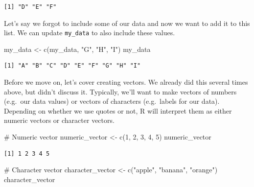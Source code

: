 \documentclass[
  letterpaper,
  DIV=11,
  numbers=noendperiod]{scrreprt}
\newenvironment{Shaded}{\begin{snugshade}}{\end{snugshade}}
\newcommand{\CommentTok}[1]{\textcolor[rgb]{0.37,0.37,0.37}{#1}}
\newcommand{\DecValTok}[1]{\textcolor[rgb]{0.68,0.00,0.00}{#1}}
\newcommand{\FunctionTok}[1]{\textcolor[rgb]{0.28,0.35,0.67}{#1}}
\newcommand{\NormalTok}[1]{\textcolor[rgb]{0.00,0.23,0.31}{#1}}
\newcommand{\OtherTok}[1]{\textcolor[rgb]{0.00,0.23,0.31}{#1}}
\newcommand{\StringTok}[1]{\textcolor[rgb]{0.13,0.47,0.30}{#1}}
\begin{document}
\begin{verbatim}
[1] "D" "E" "F"
\end{verbatim}

Let's say we forgot to include some of our data and now we want to add
it to this list. We can update \texttt{my\_data} to also include these
values.

\begin{Shaded}
\begin{Highlighting}[]
\NormalTok{my\_data }\OtherTok{\textless{}{-}} \FunctionTok{c}\NormalTok{(my\_data, }\StringTok{"G"}\NormalTok{, }\StringTok{"H"}\NormalTok{, }\StringTok{"I"}\NormalTok{)}
\NormalTok{my\_data}
\end{Highlighting}
\end{Shaded}

\begin{verbatim}
[1] "A" "B" "C" "D" "E" "F" "G" "H" "I"
\end{verbatim}

Before we move on, let's cover creating vectors. We already did this
several times above, but didn't discuss it. Typically, we'll want to
make vectors of numbers (e.g.~our data values) or vectors of characters
(e.g.~labels for our data). Depending on whether we use quotes or not, R
will interpret them as either numeric vectors or character vectors.

\begin{Shaded}
\begin{Highlighting}[]
\CommentTok{\# Numeric vector}
\NormalTok{numeric\_vector }\OtherTok{\textless{}{-}} \FunctionTok{c}\NormalTok{(}\DecValTok{1}\NormalTok{, }\DecValTok{2}\NormalTok{, }\DecValTok{3}\NormalTok{, }\DecValTok{4}\NormalTok{, }\DecValTok{5}\NormalTok{)}
\NormalTok{numeric\_vector}
\end{Highlighting}
\end{Shaded}

\begin{verbatim}
[1] 1 2 3 4 5
\end{verbatim}

\begin{Shaded}
\begin{Highlighting}[]
\CommentTok{\# Character vector}
\NormalTok{character\_vector }\OtherTok{\textless{}{-}} \FunctionTok{c}\NormalTok{(}\StringTok{"apple"}\NormalTok{, }\StringTok{"banana"}\NormalTok{, }\StringTok{"orange"}\NormalTok{)}
\NormalTok{character\_vector}
\end{Highlighting}
\end{Shaded}
\end{document}
